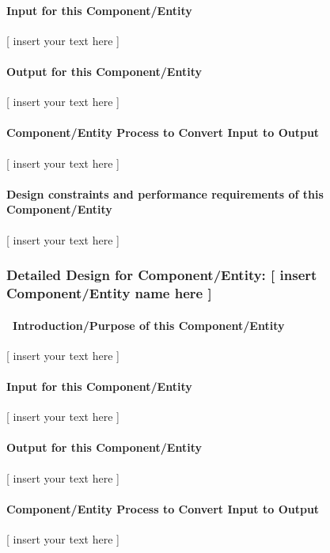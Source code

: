 \documentclass[twoside,letterpaper]{article}
\begin{document}
\paragraph{Input for this Component/Entity}
{\color{black}
[ insert your text here ]}

\paragraph{Output for this Component/Entity}
{\color{black}
[ insert your text here ]}

\paragraph{Component/Entity Process to Convert Input to Output}
{\color{black}
[ insert your text here ]}

\paragraph{Design constraints and performance requirements of this
Component/Entity}
{\color{black}
[ insert your text here ]}

\subsubsection{Detailed Design for Component/Entity: [ insert
Component/Entity name here ]}
\paragraph[\ Introduction/Purpose of this
Component/Entity]{\ Introduction/Purpose of this Component/Entity}
{\color{black}
[ insert your text here ]}

\paragraph{Input for this Component/Entity}
{\color{black}
[ insert your text here ]}

\paragraph{Output for this Component/Entity}
{\color{black}
[ insert your text here ]}

\paragraph{Component/Entity Process to Convert Input to Output}
{\color{black}
[ insert your text here ]}
\end{document}
